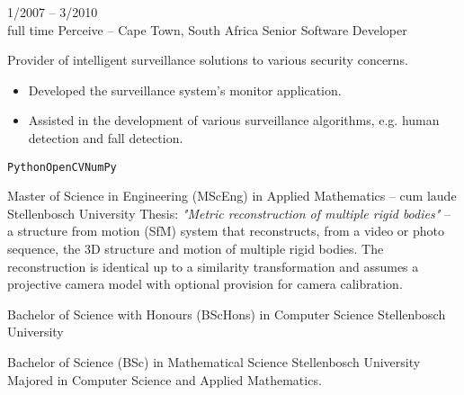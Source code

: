 \documentclass[9pt]{developercv} %
\begin{document}
\begin{entrylist}
	\entry
		{1/2007 -- 3/2010\\\footnotesize{full time}}
		{Perceive {\normalfont\small -- Cape Town, South Africa}}
		{Senior Software Developer}
		{
            Provider of intelligent surveillance solutions to various security concerns. 
            \begin{itemize}[nosep, leftmargin=*]
                \item Developed the surveillance system's monitor application.
                \item Assisted in the development of various surveillance algorithms, e.g. human detection and fall detection.
            \end{itemize}
            \texttt{Python}\pipesep\texttt{OpenCV}\pipesep\texttt{NumPy}
        }
\end{entrylist}



\parentry
    {Master of Science in Engineering (MScEng) in Applied Mathematics {\normalfont\small -- cum laude}}
    {Stellenbosch University}
    {
        Thesis: \textit{"Metric reconstruction of multiple rigid bodies"} -- a structure from motion (SfM) system that reconstructs, from a video or photo sequence, the 3D structure and motion of multiple rigid bodies. The reconstruction is identical up to a similarity transformation and assumes a projective camera model with optional provision for camera calibration.
    }
    
\parentry
    {Bachelor of Science with Honours (BScHons) in Computer Science}
    {Stellenbosch University}
    {}

\parentry
    {Bachelor of Science (BSc) in Mathematical Science}
    {Stellenbosch University}
    {Majored in Computer Science and Applied Mathematics.}

\end{document}

